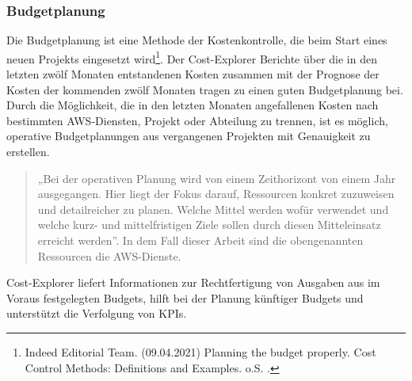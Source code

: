 \newpage
\subsubsection*{Budgetplanung}
Die Budgetplanung ist eine Methode der Kostenkontrolle, die beim Start eines neuen Projekts eingesetzt wird\footnote{Indeed Editorial Team. (09.04.2021) Planning the budget properly. Cost Control Methods: Definitions and Examples. o.S. \cite{BUD2}.}. Der Cost-Explorer Berichte über die in den letzten zwölf Monaten entstandenen Kosten zusammen mit der Prognose der Kosten der kommenden zwölf Monaten tragen zu einen guten Budgetplanung bei.
Durch die Möglichkeit, die in den letzten Monaten angefallenen Kosten nach bestimmten AWS-Diensten, Projekt oder Abteilung zu trennen, ist es möglich, operative Budgetplanungen aus vergangenen Projekten mit Genauigkeit zu erstellen. 
\begin{quote}
  „Bei der operativen Planung wird von einem Zeithorizont von einem Jahr ausgegangen. Hier liegt der Fokus darauf, Ressourcen konkret zuzuweisen und detailreicher zu planen. Welche Mittel werden wofür verwendet und welche kurz- und mittelfristigen Ziele sollen durch diesen Mitteleinsatz erreicht werden”\cite{BUD1}.
  In dem Fall dieser Arbeit sind die obengenannten Ressourcen die AWS-Dienste.
\end{quote}
Cost-Explorer liefert Informationen zur Rechtfertigung von Ausgaben aus im Voraus festgelegten Budgets, hilft bei der Planung künftiger Budgets und unterstützt die Verfolgung von KPIs.
